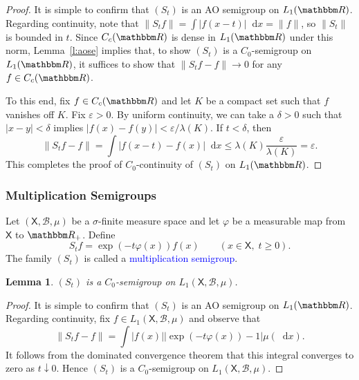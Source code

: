\documentclass[12pt, reqno]{amsart}
\renewcommand{\leq}{\leqslant}
\renewcommand{\geq}{\geqslant}
\newcommand{\1}{\mathbbm 1}
\newcommand*\diff{\mathop{}\!\mathrm{d}}
\newcommand{\bB}{\mathcal B}
\newcommand{\RR}{\mathbbm R}
\newcommand{\Xsf}{\mathsf X}
\renewcommand{\phi}{\varphi}
\renewcommand{\epsilon}{\varepsilon}
\theoremstyle{plain}
\newtheorem{lemma}[theorem]{Lemma}
\theoremstyle{definition}
\newcommand{\navy}[1]{\textcolor{blue}{#1}}
\begin{document}
\begin{proof}
    It is simple to confirm that $(S_t)$ is an AO semigroup on $L_1(\RR)$.
    Regarding continuity, note that $\|S_t f\| = \int |f(x-t)| \diff x = \| f\|$, so
    $\|S_t\|$ is bounded in $t$.  Since $C_c(\RR)$ is dense in $L_1(\RR)$ under this
    norm, Lemma~\ref{l:aose} implies that, to show $(S_t)$ is a $C_0$-semigroup
    on $L_1(\RR)$, it suffices to show that $\| S_t f - f \| \to 0$ for any $f \in
    C_c(\RR)$.

    To this end, fix $f \in C_c(\RR)$ and let $K$ be a compact set such that $f$
    vanishes off $K$.  Fix $\epsilon > 0$.  By uniform continuity, we can take a
    $\delta > 0$ such that $|x-y| < \delta$ implies $|f(x) - f(y)| < \epsilon /
    \lambda(K)$.  If $t < \delta$, then
    \begin{equation*}
        \| S_t f - f \| 
        = \int | f(x-t) - f(x) | \diff x
        \leq \lambda(K) \frac{\epsilon}{\lambda(K)} = \epsilon.
    \end{equation*}
    This completes the proof of $C_0$-continuity of $(S_t)$ on $L_1(\RR)$.
\end{proof}


\subsubsection{Multiplication Semigroups}\label{ss:multisemi}

Let $(\Xsf, \bB, \mu)$ be a $\sigma$-finite measure space and let
$\phi$ be a measurable map from $\Xsf$ to $\RR_+$.  Define
%
\begin{equation*}
    S_t f = \exp(-t \phi(x)) f(x) 
    \qquad (x \in \Xsf, \; t \geq 0).
\end{equation*}
%
The family $(S_t)$ is called a \navy{multiplication semigroup}.

\begin{lemma}\label{l:multisemi}
    $(S_t)$ is a $C_0$-semigroup on $L_1(\Xsf, \bB, \mu)$.
\end{lemma}

\begin{proof}
    It is simple to confirm that $(S_t)$ is an AO semigroup on $L_1(\RR)$.
    Regarding continuity, fix $f \in L_1(\Xsf, \bB, \mu)$ and observe that
    \begin{equation*}
        \| S_t f - f \|
        = \int |f(x)| | \exp(-t\phi(x)) - 1 | \mu(\diff x).
    \end{equation*}
    It follows from the dominated convergence theorem that this integral
    converges to zero as $t \downarrow 0$.  Hence $(S_t)$ is a $C_0$-semigroup
    on $L_1(\Xsf, \bB, \mu)$.
\end{proof}
\end{document}
